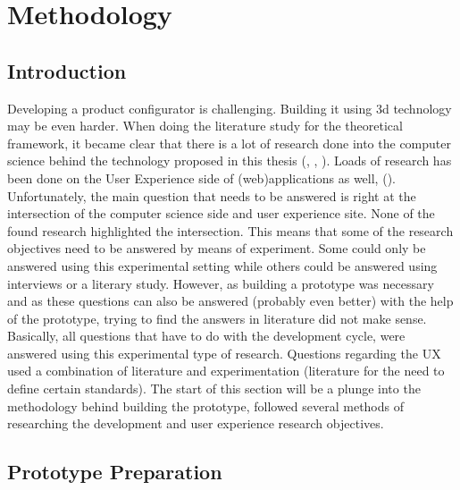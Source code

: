 

\chapter{Methodology}
\label{chapter:methodology}
\section{Introduction}
Developing a product configurator is challenging. Building it using 3d technology may be even harder. When doing the literature study for the theoretical framework, it became clear that there is a lot of research done into the computer science behind the technology proposed in this thesis (\cite{openGLsite}, \cite{microservices}, \cite{heteregoneousComputingTechniques}). Loads of research has been done on the User Experience side of (web)applications as well, (\cite{nielsonNormanReports}). Unfortunately, the main question that needs to be answered is right at the intersection of the computer science side and user experience site. None of the found research highlighted the intersection. This means that some of the research objectives need to be answered by means of experiment.
Some could only be answered using this experimental setting while others could be answered using interviews or a literary study. However, as building a prototype was necessary and as these questions can also be answered (probably even better) with the help of the prototype, trying to find the answers in literature did not make sense.
Basically, all questions that have to do with the development cycle, were answered using this experimental type of research. Questions regarding the UX used a combination of literature and experimentation (literature for the need to define certain standards). The start of this section will be a plunge into the methodology behind building the prototype, followed several methods of researching the development and user experience research objectives.

\section{Prototype Preparation}
